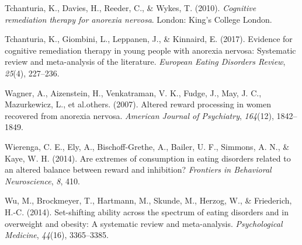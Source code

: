 \documentclass[
  man,floatsintext]{apa6}
\newlength{\cslhangindent}
\newlength{\cslentryspacingunit} %
\newenvironment{CSLReferences}[2] %
 {%
  \setlength{\parindent}{0pt}
  \ifodd #1
  \let\oldpar\par
  \def\par{\hangindent=\cslhangindent\oldpar}
  \fi
  \setlength{\parskip}{#2\cslentryspacingunit}
 }%
 {}
\begin{document}
\begin{CSLReferences}{1}{0}
\leavevmode{}%
Tchanturia, K., Davies, H., Reeder, C., \& Wykes, T. (2010). \emph{Cognitive remediation therapy for anorexia nervosa}. London: King's College London.

\leavevmode{}%
Tchanturia, K., Giombini, L., Leppanen, J., \& Kinnaird, E. (2017). Evidence for cognitive remediation therapy in young people with anorexia nervosa: Systematic review and meta-analysis of the literature. \emph{European Eating Disorders Review}, \emph{25}(4), 227--236.

\leavevmode{}%
Wagner, A., Aizenstein, H., Venkatraman, V. K., Fudge, J., May, J. C., Mazurkewicz, L., et al.others. (2007). Altered reward processing in women recovered from anorexia nervosa. \emph{American Journal of Psychiatry}, \emph{164}(12), 1842--1849.

\leavevmode{}%
Wierenga, C. E., Ely, A., Bischoff-Grethe, A., Bailer, U. F., Simmons, A. N., \& Kaye, W. H. (2014). Are extremes of consumption in eating disorders related to an altered balance between reward and inhibition? \emph{Frontiers in Behavioral Neuroscience}, \emph{8}, 410.

\leavevmode{}%
Wu, M., Brockmeyer, T., Hartmann, M., Skunde, M., Herzog, W., \& Friederich, H.-C. (2014). Set-shifting ability across the spectrum of eating disorders and in overweight and obesity: A systematic review and meta-analysis. \emph{Psychological Medicine}, \emph{44}(16), 3365--3385.

\end{CSLReferences}

\newpage
\end{document}
